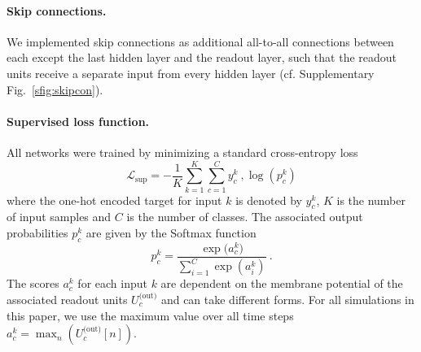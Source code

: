 \documentclass[11pt,a4paper]{article}
\begin{document}
\paragraph{Skip connections.}
We implemented skip connections as additional all-to-all connections between each except the last hidden layer and the readout layer, such that the readout units receive a separate input from every hidden layer (cf. Supplementary Fig.~\ref{sfig:skipcon}). 

\paragraph{Supervised loss function.} 
All networks were trained by minimizing a standard cross-entropy loss
\begin{equation}
\mathcal{L}_{\text{sup}} = - \frac{1}{K} \sum_{k=1}^K \sum_{c=1}^C y_c^k~,
\log\left(p_c^k\right)
\end{equation}
where the one-hot encoded target for input $k$ is denoted by $y_c^k$, $K$ is the number of input samples and $C$ is the number of classes. 
The associated output probabilities $p_c^k$ are given by the Softmax function
\begin{equation}
	p_c^k = \frac{\exp({a_c^k)}}{\sum_{i=1}^C \exp(a_i^k)} ~.
\end{equation}
The scores $a_c^k$ for each input $k$ are dependent on the membrane potential of the associated readout units $U_c^{\text{(out)}}$ and can take different forms. 
For all simulations in this paper, we use the maximum value over all time steps $a_c^k = \max_n\left(U_c^{\text{(out)}}[n]\right)$.
\end{document}
